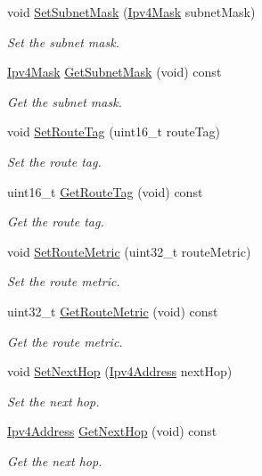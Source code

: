 \begin{DoxyCompactItemize}
void \hyperlink{classns3_1_1RipRte_a0b806b2874053eed903b2d4286c37bbd}{Set\+Subnet\+Mask} (\hyperlink{classns3_1_1Ipv4Mask}{Ipv4\+Mask} subnet\+Mask)
\begin{DoxyCompactList}\small\item\em Set the subnet mask. \end{DoxyCompactList}\item 
\hyperlink{classns3_1_1Ipv4Mask}{Ipv4\+Mask} \hyperlink{classns3_1_1RipRte_a0ceada72e4aefe1747e0f0d466f354c6}{Get\+Subnet\+Mask} (void) const 
\begin{DoxyCompactList}\small\item\em Get the subnet mask. \end{DoxyCompactList}\item 
void \hyperlink{classns3_1_1RipRte_ad01bfc28a5ca8c42fb847410de179a66}{Set\+Route\+Tag} (uint16\+\_\+t route\+Tag)
\begin{DoxyCompactList}\small\item\em Set the route tag. \end{DoxyCompactList}\item 
uint16\+\_\+t \hyperlink{classns3_1_1RipRte_abc27d2f714b82b528f0e56a927b26e31}{Get\+Route\+Tag} (void) const 
\begin{DoxyCompactList}\small\item\em Get the route tag. \end{DoxyCompactList}\item 
void \hyperlink{classns3_1_1RipRte_a1ca87124272e6d326588ff5cdb0d03de}{Set\+Route\+Metric} (uint32\+\_\+t route\+Metric)
\begin{DoxyCompactList}\small\item\em Set the route metric. \end{DoxyCompactList}\item 
uint32\+\_\+t \hyperlink{classns3_1_1RipRte_a98cebe4bfde221d97d54de4af62c38c6}{Get\+Route\+Metric} (void) const 
\begin{DoxyCompactList}\small\item\em Get the route metric. \end{DoxyCompactList}\item 
void \hyperlink{classns3_1_1RipRte_ae248b7670c8731e497a5f4140fbd8950}{Set\+Next\+Hop} (\hyperlink{classns3_1_1Ipv4Address}{Ipv4\+Address} next\+Hop)
\begin{DoxyCompactList}\small\item\em Set the next hop. \end{DoxyCompactList}\item 
\hyperlink{classns3_1_1Ipv4Address}{Ipv4\+Address} \hyperlink{classns3_1_1RipRte_a7ac227e65e9476af03210400f7dfb5ce}{Get\+Next\+Hop} (void) const 
\begin{DoxyCompactList}\small\item\em Get the next hop. \end{DoxyCompactList}\end{DoxyCompactItemize}
